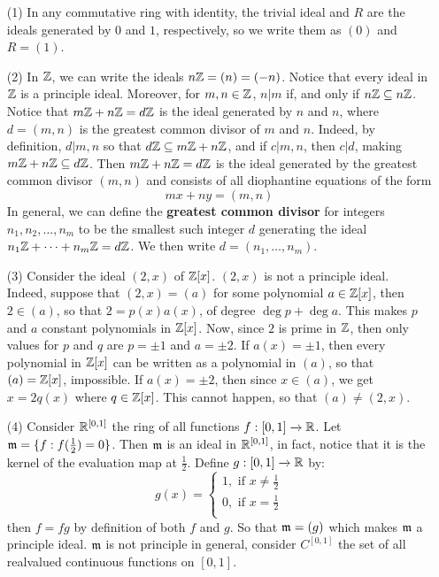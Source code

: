 \begin{example}\label{example_5.13}
  \begin{enumerate}
    \item[(1)] In any commutative ring with identity, the trivial ideal and
      $R$ are the ideals generated by $0$ and $1$, respectively, so we
      write them as $(0)$ and $R=(1)$.

    \item[(2)] In $\mathbb{Z}$, we can write the ideals  $n\mathbb{Z}=(n)=(-n)$. Notice that
      every ideal in $\mathbb{Z}$ is a principle ideal. Moreover, for $m,n \in
      \mathbb{Z}$, $n|m$ if, and only if  $n\mathbb{Z} \subseteq n\mathbb{Z}$. Notice that
      $m\mathbb{Z}+n\mathbb{Z}=d\mathbb{Z}$ is the ideal generated by $n$ and $n$, where $d=(m,n)$
      is the greatest common divisor of $m$ and  $n$. Indeed, by
      definition, $d|m,n$ so that $d\mathbb{Z} \subseteq m\mathbb{Z}+n\mathbb{Z}$, and if
      $c|m,n$, then  $c|d$, making  $m\mathbb{Z}+n\mathbb{Z} \subseteq d\mathbb{Z}$. Then
      $m\mathbb{Z}+n\mathbb{Z}=d\mathbb{Z}$ is the ideal generated by the greatest common divisor
      $(m,n)$ and consists of all diophantine equations of the form
      \begin{equation*}
        mx+ny=(m,n)
      \end{equation*}
      In general, we can define the \textbf{greatest common divisor} for
      integers $n_1, n_2, \dots, n_m$ to be the smallest such integer $d$
      generating the ideal $n_1\mathbb{Z}+\dots+n_m\mathbb{Z}=d\mathbb{Z}$. We then write
      $d=(n_1, \dots, n_m)$.

    \item[(3)] Consider the ideal $(2,x)$ of $\mathbb{Z}[x]$. $(2,x)$ is not a
      principle ideal. Indeed, suppose that $(2,x)=(a)$ for some
      polynomial $a \in \mathbb{Z}[x]$, then $2 \in (a)$, so that $2=p(x)a(x)$,
      of degree $\deg{p}+\deg{a}$. This makes $p$ and $a$ constant
      polynomials in $\mathbb{Z}[x]$. Now, since $2$ is prime in $\mathbb{Z}$, then only
      values for $p$ and  $q$ are  $p=\pm1$ and $a=\pm2$. If $a(x)=\pm1$,
      then every polynomial in $\mathbb{Z}[x]$ can be written as a polynomial in
      $(a)$, so that $(a)=\mathbb{Z}[x]$, impossible. If $a(x)=\pm2$, then since
      $x \in (a)$, we get $x=2q(x)$ where $q \in \mathbb{Z}[x]$. This cannot
      happen, so that $(a) \neq (2,x)$.


    \item[(4)] Consider $\mathbb{R}^{[0,1]}$ the ring of all functions $f:[0,1]
      \xrightarrow{} \mathbb{R}$. Let $\mathfrak{m}=\{f : f(\frac{1}{2})=0\}$. Then
      $\mathfrak{m}$ is an ideal in $\mathbb{R}^{[0,1]}$, in fact, notice that it is the
      kernel of the evaluation map at $\frac{1}{2}$. Define $g:[0,1] \xrightarrow{}
      \mathbb{R}$ by:
      \begin{equation*}
        g(x)=\begin{cases}
          1, \text{ if } x \neq \frac{1}{2}  \\
          0, \text{ if } x=\frac{1}{2}   \\
        \end{cases}
      \end{equation*}
      then $f=fg$ by definition of both  $f$ and $g$. So that $\mathfrak{m}=(g)$
      which makes $\mathfrak{m}$ a principle ideal. $\mathfrak{m}$ is not principle in general,
      consider $C^{[0,1]}$ the set of all realvalued continuous functions
      on $[0,1]$.


\end{enumerate}
\end{example}
